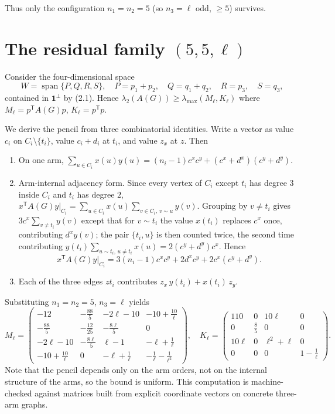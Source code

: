\documentclass[11pt,a4paper]{article}
\theoremstyle{plain}
\theoremstyle{definition}
\newcommand{\bdG}{A(G)}
\begin{document}
Thus only the configuration $n_1=n_2=5$ (so $n_3=\ell$ odd, $\ge5$) survives.

\section{The residual family $(5,5,\ell)$}

Consider the four-dimensional space
\[
  W=\operatorname{span}\{P,Q,R,S\},\quad
  P=p_1+p_2,\quad Q=q_1+q_2,\quad R=p_3,\quad S=q_3,
\]
contained in $\mathbf 1^\perp$ by (2.1). Hence
$\lambda_2(\bdG)\ge\lambda_{\max}(M_\ell,K_\ell)$ where
$M_\ell=p^{\mathsf T}\bdG p$, $K_\ell=p^{\mathsf T}p$.

We derive the pencil from three combinatorial identities. Write a vector as
value $c_i$ on $C_i\setminus\{t_i\}$, value $c_i+d_i$ at $t_i$, and value
$z_x$ at $z$. Then
\begin{enumerate}[leftmargin=2em,itemsep=2pt]
\item[(i)] On one arm,
$\sum_{u\in C_i}x(u)y(u)=(n_i-1)c^xc^y+(c^x+d^x)(c^y+d^y)$.
\item[(ii)] Arm-internal adjacency form. Since every vertex of $C_i$ except
$t_i$ has degree $3$ inside $C_i$ and $t_i$ has degree $2$,
$x^{\mathsf T}\bdG y|_{C_i}=\sum_{u\in C_i}x(u)\sum_{v\in C_i,\,v\sim u}y(v)$.
Grouping by $v\neq t_i$ gives $3c^x\sum_{v\neq t_i}y(v)$ except that for
$v\sim t_i$ the value $x(t_i)$ replaces $c^x$ once, contributing $d^xy(v)$;
the pair $\{t_i,u\}$ is then counted twice, the second time contributing
$y(t_i)\sum_{u\sim t_i,\,u\neq t_i}x(u)=2(c^y+d^y)c^x$. Hence
\[
   x^{\mathsf T}\bdG y|_{C_i}=3(n_i-1)c^xc^y+2d^xc^y+2c^x(c^y+d^y).
\]
\item[(iii)] Each of the three edges $zt_i$ contributes
$z_x\,y(t_i)+x(t_i)\,z_y$.
\end{enumerate}

Substituting $n_1=n_2=5$, $n_3=\ell$ yields
\[
 M_\ell=\begin{pmatrix}
 -12 & -\tfrac{88}{5} & -2\ell-10 & -10+\tfrac{10}{\ell}\\
 -\tfrac{88}{5} & -\tfrac{12}{25} & -\tfrac{8\ell}{5} & 0\\
 -2\ell-10 & -\tfrac{8\ell}{5} & \ell-1 & -\ell+\tfrac1\ell\\
 -10+\tfrac{10}{\ell} & 0 & -\ell+\tfrac1\ell & -\tfrac1\ell-\tfrac1{\ell^2}
 \end{pmatrix},\quad
 K_\ell=\begin{pmatrix}
 110 & 0 & 10\ell & 0\\
 0 & \tfrac85 & 0 & 0\\
 10\ell & 0 & \ell^2+\ell & 0\\
 0 & 0 & 0 & 1-\tfrac1\ell
 \end{pmatrix}.
\]
Note that the pencil depends only on the arm orders, not on the internal
structure of the arms, so the bound is uniform. This computation is
machine-checked against matrices built from explicit coordinate vectors on
concrete three-arm graphs.
\end{document}
